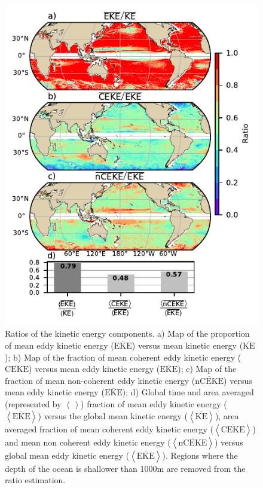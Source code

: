 \documentclass[draft,linenumbers]{agujournal2019}
\newcommand{\MKE}{\overline{\textrm{KE}}}
\newcommand{\MEKE}{\overline{\textrm{EKE}}}
\newcommand{\MCEKE}{\overline{\textrm{CEKE}}}
\newcommand{\MnCEKE}{\overline{\textrm{nCEKE}}}
\begin{document}
	\begin{figure}
	    \centering
	    \includegraphics[width=1\textwidth]{./figures/eke_ratio_map_easy.pdf}
	    \caption{Ratios of the kinetic energy components. a) Map of the proportion of mean eddy kinetic energy ($\MEKE$) versus mean kinetic energy ($\MKE$);
		b) Map of the fraction of mean coherent eddy kinetic energy ($\MCEKE$) versus mean eddy kinetic energy ($\MEKE$);
		c) Map of the fraction of mean non-coherent eddy kinetic energy ($\MnCEKE$) versus mean eddy kinetic energy ($\MEKE$);
		d) Global time and area averaged (represented by $\left<\,\right>$) fraction of mean eddy kinetic energy ($\left<\MEKE\right>$) versus the global mean kinetic energy ($\left<\MKE\right>$), area averaged fraction of mean coherent eddy kinetic energy ($\left<\MCEKE\right>$) and mean non coherent eddy kinetic energy ($\left<\MnCEKE\right>$) versus global mean eddy kinetic energy ($\left<\MEKE\right>$). Regions where the depth of the ocean is shallower than 1000m are removed from the ratio estimation.
		}
	    \label{fig:eddy_ratio}
	\end{figure}
\end{document}
